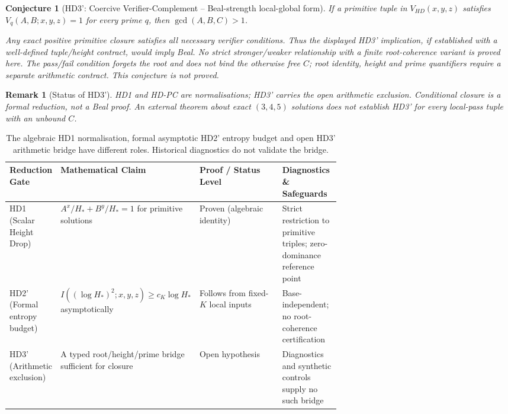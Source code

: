 \documentclass[11pt,a4paper]{article}
\newtheorem{conjecture}[theorem]{Conjecture}
\newtheorem{remark}[theorem]{Remark}
\begin{document}
\begin{conjecture}[HD3': Coercive Verifier-Complement -- Beal-strength
local-global form]
\label{conj:hd3prime}
If a primitive tuple in $V_{HD}(x,y,z)$ satisfies $V_q(A,B;x,y,z)=1$
for every prime $q$, then $\gcd(A,B,C)>1$.

Any exact positive primitive closure satisfies all necessary verifier
conditions. Thus the displayed HD3' implication, if established with a
well-defined tuple/height contract, would imply Beal. No strict stronger/weaker
relationship with a finite root-coherence variant is proved here.
The pass/fail condition forgets the root and does not bind the otherwise
free $C$; root identity, height and prime quantifiers require a separate
arithmetic contract. This conjecture is not proved.
\end{conjecture}
\begin{remark}[Status of HD3']
HD1 and HD-PC are normalisations; HD3' carries the open arithmetic
exclusion. Conditional closure is a formal reduction, not a Beal proof.
An external theorem about exact $(3,4,5)$ solutions does not establish
HD3' for every local-pass tuple with an unbound $C$.
\end{remark}

\begin{table}[htb]
\centering
\small
\begin{tabularx}{\textwidth}{@{} >{\raggedright\arraybackslash}p{0.15\linewidth} >{\raggedright\arraybackslash}p{0.25\linewidth} >{\raggedright\arraybackslash}p{0.25\linewidth} >{\raggedright\arraybackslash}X @{}}
\toprule
Reduction Gate & Mathematical Claim & Proof / Status Level & Diagnostics \& Safeguards \\
\midrule
HD1 (Scalar Height Drop) & $A^x/H_* + B^y/H_* = 1$ for primitive solutions & Proven (algebraic identity) & Strict restriction to primitive triples; zero-dominance reference point \\
\addlinespace
HD2' (Formal entropy budget) & $I((\log H_*)^2;x,y,z)\ge c_K\log H_*$ asymptotically & Follows from fixed-$K$ local inputs & Base-independent; no root-coherence certification \\
\addlinespace
HD3' (Arithmetic exclusion) & A typed root/height/prime bridge sufficient for closure & Open hypothesis & Diagnostics and synthetic controls supply no such bridge \\
\bottomrule
\end{tabularx}
\caption{The algebraic HD1 normalisation, formal asymptotic HD2' entropy budget and open HD3' arithmetic bridge have different roles. Historical diagnostics do not validate the bridge.}
\label{tab:reduction_matrix}
\end{table}
\end{document}
